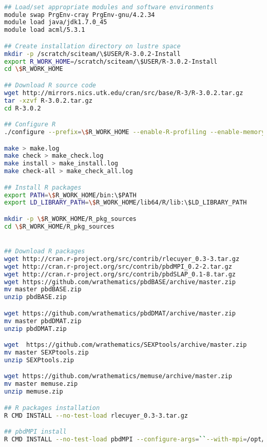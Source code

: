 \begin{lstlisting}[language=bash]

## Load/set appropriate modules and software environments 
module swap PrgEnv-cray PrgEnv-gnu/4.2.34
module load java/jdk1.7.0_45
module load acml/5.3.1

## Create installation directory on lustre space
mkdir -p /scratch/sciteam/\$USER/R-3.0.2-Install
export R_WORK_HOME=/scratch/sciteam/\$USER/R-3.0.2-Install
cd \$R_WORK_HOME

## Download R source code 
wget http://mirrors.nics.utk.edu/cran/src/base/R-3/R-3.0.2.tar.gz
tar -xzvf R-3.0.2.tar.gz
cd R-3.0.2

## Configure R
./configure --prefix=\$R_WORK_HOME --enable-R-profiling --enable-memory-profiling --enable-R-shlib --enable-BLAS-shlib --enable-lto --enable-byte-compiled-packages --enable-shared --enable-long-double --with-readline --with-tcltk --with-cairo --with-libpng --with-jpeglib --with-libtiff --with-system-pcre --with-valgrind-instrumentation --with-x --with-blas=``-I/opt/acml/5.3.1/gfortran64_mp/include -L/opt/acml/5.3.1/gfortran64_mp/lib -lacml_mp'' --with-lapack > configure.log

make > make.log
make check > make_check.log
make install > make_install.log
make check-all > make_check_all.log

## Install R packages
export PATH=\$R_WORK_HOME/bin:\$PATH
export LD_LIBRARY_PATH=\$R_WORK_HOME/lib64/R/lib:\$LD_LIBRARY_PATH

mkdir -p \$R_WORK_HOME/R_pkg_sources
cd \$R_WORK_HOME/R_pkg_sources


## Download R packages
wget http://cran.r-project.org/src/contrib/rlecuyer_0.3-3.tar.gz
wget http://cran.r-project.org/src/contrib/pbdMPI_0.2-2.tar.gz
wget http://cran.r-project.org/src/contrib/pbdSLAP_0.1-8.tar.gz
wget https://github.com/wrathematics/pbdBASE/archive/master.zip
mv master pbdBASE.zip
unzip pbdBASE.zip

wget https://github.com/wrathematics/pbdDMAT/archive/master.zip
mv master pbdDMAT.zip
unzip pbdDMAT.zip

wget  https://github.com/wrathematics/SEXPtools/archive/master.zip
mv master SEXPtools.zip
unzip SEXPtools.zip

wget https://github.com/wrathematics/memuse/archive/master.zip
mv master memuse.zip
unzip memuse.zip

## R packages installation
R CMD INSTALL --no-test-load rlecuyer_0.3-3.tar.gz

## pbdMPI install
R CMD INSTALL --no-test-load pbdMPI --configure-args=``--with-mpi=/opt/cray/mpt/6.2.0/gni/mpich2-gnu/48/ --with-mpi-type=MPICH3''


\end{lstlisting}
